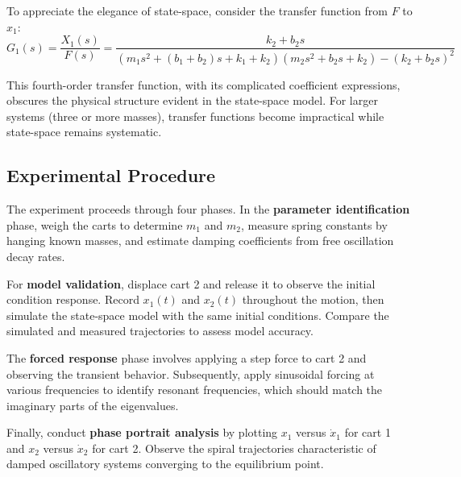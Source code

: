 To appreciate the elegance of state-space, consider the transfer function from $F$ to $x_1$:
\begin{equation}
    G_1(s) = \frac{X_1(s)}{F(s)} = \frac{k_2 + b_2 s}{(m_1 s^2 + (b_1+b_2)s + k_1+k_2)(m_2 s^2 + b_2 s + k_2) - (k_2 + b_2 s)^2}
\end{equation}

This fourth-order transfer function, with its complicated coefficient expressions, obscures the physical structure evident in the state-space model. For larger systems (three or more masses), transfer functions become impractical while state-space remains systematic.

\subsection{Experimental Procedure}

The experiment proceeds through four phases. In the \textbf{parameter identification} phase, weigh the carts to determine $m_1$ and $m_2$, measure spring constants by hanging known masses, and estimate damping coefficients from free oscillation decay rates.

For \textbf{model validation}, displace cart 2 and release it to observe the initial condition response. Record $x_1(t)$ and $x_2(t)$ throughout the motion, then simulate the state-space model with the same initial conditions. Compare the simulated and measured trajectories to assess model accuracy.

The \textbf{forced response} phase involves applying a step force to cart 2 and observing the transient behavior. Subsequently, apply sinusoidal forcing at various frequencies to identify resonant frequencies, which should match the imaginary parts of the eigenvalues.

Finally, conduct \textbf{phase portrait analysis} by plotting $x_1$ versus $\dot{x}_1$ for cart 1 and $x_2$ versus $\dot{x}_2$ for cart 2. Observe the spiral trajectories characteristic of damped oscillatory systems converging to the equilibrium point.

